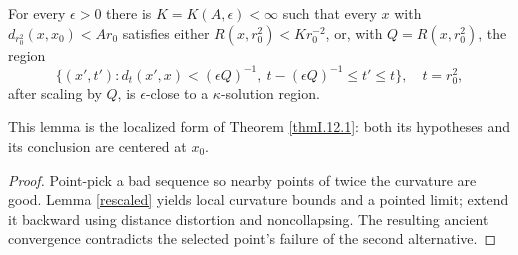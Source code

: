 \begin{lemma}
\label{lem:kl-later-scalar-curvature-bounds-bigger-balls-from-curvature-volume-bounds-existence-kappa-solutions}

\label{12.2lemma}
For every $\epsilon>0$ there is $K=K(A,\epsilon)<\infty$ such that every
$x$ with $d_{r_0^2}(x,x_0)<Ar_0$ satisfies either
$R(x,r_0^2)<Kr_0^{-2}$, or, with $Q=R(x,r_0^2)$, the region
\[
\{(x',t'):d_t(x',x)<(\epsilon Q)^{-1},\
t-(\epsilon Q)^{-1}\leq t'\leq t\},\quad t=r_0^2,
\]
after scaling by $Q$, is $\epsilon$-close to a $\kappa$-solution region.
\end{lemma}
\begin{remark}
\label{rem:kl-later-scalar-curvature-bounds-bigger-balls-from-curvature-volume-bounds-structural-remark-thick-thin-geometry}
\source{kleiner-lott}
\dcref{Remark 53.4}


This lemma is the localized form of Theorem \ref{thmI.12.1}: both its
hypotheses and its conclusion are centered at $x_0$.
\end{remark}
\begin{proof}
\sketch Point-pick a bad sequence so nearby points of twice the curvature are
good.  Lemma \ref{rescaled} yields local curvature bounds and a pointed
limit; extend it backward using distance distortion and noncollapsing.  The
resulting ancient convergence contradicts the selected point's failure of
the second alternative.
\end{proof}
